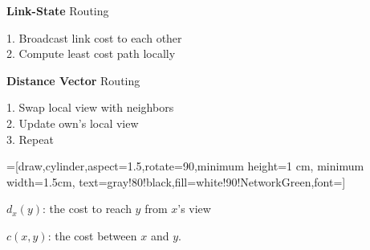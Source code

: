 \begin{cf}{
	\textbf{Link-State} Routing
}
\end{cf}

\begin{cf}{\normalsize
	1. Broadcast link cost to each other\\
	2. Compute least cost path locally
}
\end{cf}

\begin{cf}{
	\textbf{Distance Vector} Routing
}
\end{cf}

\begin{cf}{\normalsize
	1. Swap local view with neighbors\\
	2. Update own's local view\\
	3. Repeat
}
\end{cf}

=[draw,cylinder,aspect=1.5,rotate=90,minimum height=1 cm, minimum width=1.5cm, text=gray!80!black,fill=white!90!NetworkGreen,font=\small]

\begin{cf}{\normalsize
	$d_x(y)$: the cost to reach $y$ from $x$'s view\\[1cm]
}
\end{cf}

\begin{cf}{\normalsize
	$c(x,y)$: the cost between $x$ and $y$.\\[1cm]
}
\end{cf}

